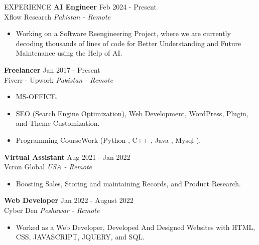\documentclass{resume}
\begin{document}
\begin{rSection}{EXPERIENCE}
\textbf{AI Engineer} \hfill Feb 2024 - Present\\
Xflow Research \hfill \textit{Pakistan - Remote}
 \begin{itemize}
    \itemsep -3pt {} 
     \item Working on a Software Reengineering Project, where we are currently decoding thousands of lines of code for Better Understanding and Future Maintenance using the Help of AI.

 \end{itemize}


\textbf{Freelancer} \hfill Jan 2017 - Present\\
Fiverr - Upwork \hfill \textit{Pakistan - Remote}
 \begin{itemize}
    \itemsep -3pt {} 
     \item MS-OFFICE.
     \item SEO (Search Engine Optimization), Web Development, WordPress, Plugin, and Theme Customization.
    \item Programming CourseWork (Python , C++ , Java , Mysql ). 
 \end{itemize}

\textbf{Virtual Assistant} \hfill Aug 2021 - Jan 2022\\
Vcron Global \hfill \textit{USA - Remote}
 \begin{itemize}
    \itemsep -3pt {} 
     \item Boosting Sales, Storing and maintaining Records, and  Product Research.
    
 \end{itemize}
 


 \textbf{Web Developer } \hfill Jan 2022 -  August 2022\\
Cyber Den \hfill \textit{Peshawar - Remote}
 \begin{itemize}
    \itemsep -3pt {} 
     \item Worked as a Web Developer, Developed And Designed Websites with HTML, CSS, JAVASCRIPT, JQUERY, and SQL.
     
 \end{itemize}

\end{rSection} 

\end{document}
